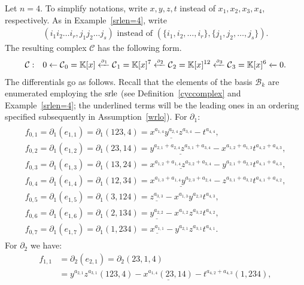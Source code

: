 \documentclass[ALCO]{cedram}
\newcommand{\mbk}{\mbox{$\mathbb{K}$}}
\newcommand{\mcb}{\mbox{$\mathcal{B}$}}
\newcommand{\mcc}{\mbox{$\mathcal{C}$}}
\newcommand{\dif}{\mbox{$\partial$}}
\newcommand{\sdif}{\mbox{\tiny $\partial$}}
\newcommand{\srle}{\mbox{${\rm srle}$}}
\begin{document}
\begin{example}\label{cyc4}
Let $n=4$. To simplify notations, write $x,y,z,t$ instead of
$x_1,x_2,x_3,x_4$, respectively. As in Example~\ref{srlen=4}, write
\begin{eqnarray*}
(i_1i_2\ldots i_r,j_1j_2\ldots j_s)\mbox{ instead of }(\{i_1,i_2,\ldots
,i_r\},\{j_1,j_2,\ldots ,j_s\}).
\end{eqnarray*}
The resulting complex $\mcc$ has the following form.
\begin{eqnarray*}
\mcc&:&0\leftarrow
\mcc_0=\mbk[x]\xleftarrow{\sdif_{1}}\mcc_{1}=\mbk[x]^{7}
\xleftarrow{\sdif_{2}}\mcc_{2}=\mbk[x]^{12}\xleftarrow{\sdif_{3}}
\mcc_{3}=\mbk[x]^{6}\xleftarrow{} 0.
\end{eqnarray*}
The differentials go as follows. Recall that the elements of the basis
$\mcb_k$ are enumerated employing the $\srle$ (see
Definition~\ref{cyccomplex} and Example~\ref{srlen=4}; the underlined
terms will be the leading ones in an ordering specified subsequently
in Assumption~\ref{wrlo}). For $\dif_1$:
\begin{eqnarray*}
\begin{array}{l}
f_{0,1}=\dif_1(e_{1,1})=\dif_1(123,4)=
\underline{x^{a_{1,4}}y^{a_{2,4}}z^{a_{3,4}}}-t^{a_{4,4}},\\
f_{0,2}=\dif_1(e_{1,2})=\dif_1(23,14)=
\underline{y^{a_{2,1}+a_{2,4}}z^{a_{3,1}+a_{3,4}}}-
x^{a_{1,2}+a_{1,3}}t^{a_{4,2}+a_{4,3}},\\
f_{0,3}=\dif_1(e_{1,3})=\dif_1(13,24)=
\underline{x^{a_{1,2}+a_{1,4}}z^{a_{3,2}+a_{3,4}}}-
y^{a_{2,1}+a_{2,3}}t^{a_{4,1}+a_{4,3}},\\
f_{0,4}=\dif_1(e_{1,4})=\dif_1(12,34)=
\underline{x^{a_{1,3}+a_{1,4}}y^{a_{2,3}+a_{2,4}}}-
z^{a_{3,1}+a_{3,2}}t^{a_{4,1}+a_{4,2}},\\
f_{0,5}=\dif_1(e_{1,5})=\dif_1(3,124)=
\underline{z^{a_{3,3}}}-x^{a_{1,3}}y^{a_{2,3}}t^{a_{4,3}},\\
f_{0,6}=\dif_1(e_{1,6})=\dif_1(2,134)=
\underline{y^{a_{2,2}}}-x^{a_{1,2}}z^{a_{3,2}}t^{a_{4,2}},\\
f_{0,7}=\dif_1(e_{1,7})=\dif_1(1,234)=
\underline{x^{a_{1,1}}}-y^{a_{2,1}}z^{a_{3,1}}t^{a_{4,1}}.
\end{array}
\end{eqnarray*}
For $\dif_2$ we have:
\begin{align*}
f_{1,1}&= \dif_2(e_{2,1})=\dif_2(23,1,4)\\
&= y^{a_{2,1}}z^{a_{3,1}}(123,4)-\underline{x^{a_{1,4}}(23,14)}-
t^{a_{4,2}+a_{4,3}}(1,234),\\

\end{align*}
\end{example}
\end{document}
